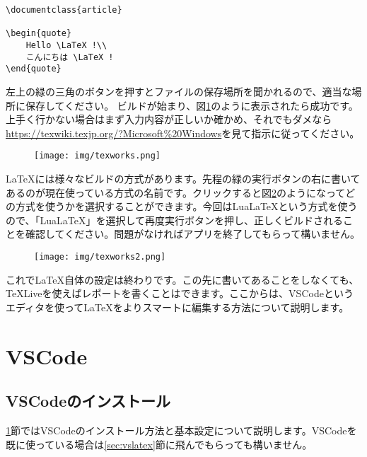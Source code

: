 \begin{lstlisting}[language={[LaTeX]TeX}, caption=TeXLiveのテストコード, label=code:TexLiveのテストコード]
\documentclass{article}

\begin{quote}
    Hello \LaTeX !\\
    こんにちは \LaTeX !
\end{quote}

\end{lstlisting}

左上の緑の三角のボタンを押すとファイルの保存場所を聞かれるので、適当な場所に保存してください。 ビルドが始まり、図\ref{fig:texworks1}のように表示されたら成功です。上手く行かない場合はまず入力内容が正しいか確かめ、それでもダメなら\url{https://texwiki.texjp.org/?Microsoft%20Windows}を見て指示に従ってください。

\begin{figure}[H]
    \centering
    \texttt{[image: img/texworks.png]}
    \caption{}
    \label{fig:texworks1}
\end{figure}
\LaTeX には様々なビルドの方式があります。先程の緑の実行ボタンの右に書いてあるのが現在使っている方式の名前です。クリックすると図\ref{fig:texworks2}のようになってどの方式を使うかを選択することができます。今回はLua\LaTeX という方式を使うので、「LuaLaTeX」を選択して再度実行ボタンを押し、正しくビルドされることを確認してください。問題がなければアプリを終了してもらって構いません。

\begin{figure}[H]
    \centering
    \texttt{[image: img/texworks2.png]}
    \caption{}
    \label{fig:texworks2}
\end{figure}
これで\LaTeX 自体の設定は終わりです。この先に書いてあることをしなくても、\TeX Liveを使えばレポートを書くことはできます。ここからは、VSCodeというエディタを使って\LaTeX をよりスマートに編集する方法について説明します。

\section{VSCode}\label{sec:VSCode}
\subsection{VSCodeのインストール}\label{sec:vsinstall}
\ref{sec:VSCode}節ではVSCodeのインストール方法と基本設定について説明します。VSCodeを既に使っている場合は\ref{sec:vslatex}節に飛んでもらっても構いません。

